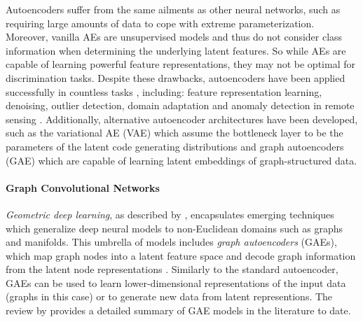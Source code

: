 Autoencoders suffer from the same ailments as other neural networks, such as requiring large amounts of data to cope with extreme parameterization.  Moreover, vanilla AEs are unsupervised models and thus do not consider class information when determining the underlying latent features. So while AEs are capable of learning powerful feature representations, they may not be optimal for discrimination tasks.  Despite these drawbacks, autoencoders have been applied successfully in countless tasks \citep{Tschannen2018RecentAdvancesAutoencoder, Yuan2019AutoencoderSurvey, Chen2019DeepAutoencoders, Kosiorek2019StackedCapsuleAutoencoders}, including: feature representation learning, denoising, outlier detection, domain adaptation and anomaly detection in remote sensing \citep{Bengio2014RepLearningReview}.  Additionally, alternative autoencoder architectures have been developed, such as the variational AE (VAE) \citep{Ghaffarzadegan2018MILVAE, Dai2017VariationalAutoencoder} which assume the bottleneck layer to be the parameters of the latent code generating distributions and graph autoencoders (GAE) \citep{Wu2019SurveyGraphConvolutionalNeuralNetworks} which are capable of learning latent embeddings of graph-structured data.

\paragraph{Graph Convolutional Networks} \label{sec:Graph_CNN}
\textit{Geometric deep learning}, as described by \citep{Bronstein2017GeometricDeepLearning}, encapsulates emerging techniques which generalize deep neural models to non-Euclidean domains such as graphs and manifolds.  This umbrella of models includes \textit{graph autoencoders} (GAEs), which map graph nodes into a latent feature space and decode graph information from the latent node representations \citep{Wu2019SurveyGraphConvolutionalNeuralNetworks, Liu2018ConstrainedGraphVariationalAutoencoders, Pan2018AdversariallyRegGraphAutoencoder}.  Similarly to the standard autoencoder, GAEs can be used to learn lower-dimensional representations of the input data (graphs in this case) or to generate new data from latent representions.  The review by \cite{Wu2019SurveyGraphConvolutionalNeuralNetworks} provides a detailed summary of GAE models in the literature to date.


